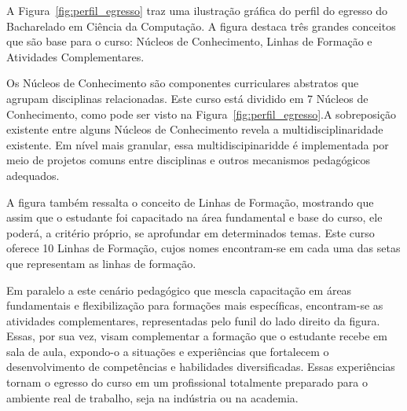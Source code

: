 

A Figura~\ref{fig:perfil_egresso} traz uma ilustração gráfica do perfil do egresso do Bacharelado em Ciência da Computação. A figura destaca três grandes conceitos que são base para o curso: Núcleos de Conhecimento, Linhas de Formação e Atividades Complementares. 

Os Núcleos de Conhecimento são componentes curriculares abstratos que agrupam disciplinas relacionadas. Este curso está dividido em 7 Núcleos de Conhecimento, como pode ser visto na Figura~\ref{fig:perfil_egresso}.A sobreposição existente entre alguns Núcleos de Conhecimento revela a multidisciplinaridade existente. Em nível mais granular, essa multidiscipinaridde é implementada por meio de projetos comuns entre disciplinas e outros mecanismos pedagógicos adequados. 

A figura também ressalta o conceito de Linhas de Formação, mostrando que assim que o estudante foi capacitado na área fundamental e base do curso, ele poderá, a critério próprio, se aprofundar em determinados temas. Este curso oferece 10 Linhas de Formação, cujos nomes encontram-se em cada uma das setas que representam as linhas de formação.

Em paralelo a este cenário pedagógico que mescla capacitação em áreas fundamentais e flexibilização para formações mais específicas, encontram-se as atividades complementares, representadas pelo funil do lado direito da figura. Essas, por sua vez, visam complementar a formação que o estudante recebe em sala de aula, expondo-o a situações e experiências que fortalecem o desenvolvimento de competências e habilidades diversificadas. Essas experiências tornam o egresso do curso em um profissional totalmente preparado para o ambiente real de trabalho, seja na indústria ou na academia. 

